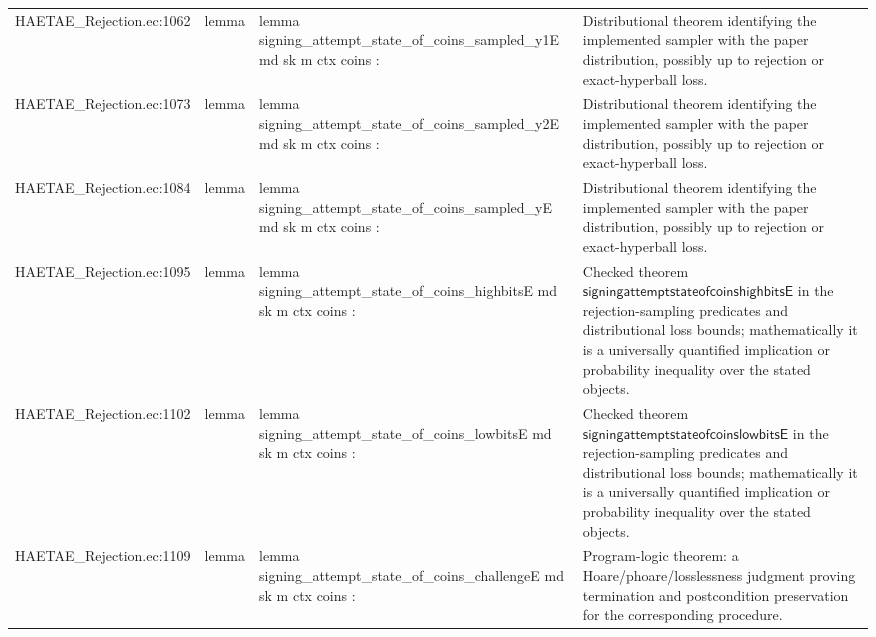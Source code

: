 \documentclass[10pt]{article}
\begin{document}
\begin{longtable}{L{0.11\textwidth}L{0.055\textwidth}L{0.385\textwidth}L{0.41\textwidth}}
HAETAE\_\allowbreak{}Rejection.\allowbreak{}ec:\allowbreak{}1062 & lemma & {\ttfamily\scriptsize lemma signing\_\allowbreak{}attempt\_\allowbreak{}state\_\allowbreak{}of\_\allowbreak{}coins\_\allowbreak{}sampled\_\allowbreak{}y1E md sk m ctx coins :} & Distributional theorem identifying the implemented sampler with the paper distribution, possibly up to rejection or exact-hyperball loss. \\
HAETAE\_\allowbreak{}Rejection.\allowbreak{}ec:\allowbreak{}1073 & lemma & {\ttfamily\scriptsize lemma signing\_\allowbreak{}attempt\_\allowbreak{}state\_\allowbreak{}of\_\allowbreak{}coins\_\allowbreak{}sampled\_\allowbreak{}y2E md sk m ctx coins :} & Distributional theorem identifying the implemented sampler with the paper distribution, possibly up to rejection or exact-hyperball loss. \\
HAETAE\_\allowbreak{}Rejection.\allowbreak{}ec:\allowbreak{}1084 & lemma & {\ttfamily\scriptsize lemma signing\_\allowbreak{}attempt\_\allowbreak{}state\_\allowbreak{}of\_\allowbreak{}coins\_\allowbreak{}sampled\_\allowbreak{}yE md sk m ctx coins :} & Distributional theorem identifying the implemented sampler with the paper distribution, possibly up to rejection or exact-hyperball loss. \\
HAETAE\_\allowbreak{}Rejection.\allowbreak{}ec:\allowbreak{}1095 & lemma & {\ttfamily\scriptsize lemma signing\_\allowbreak{}attempt\_\allowbreak{}state\_\allowbreak{}of\_\allowbreak{}coins\_\allowbreak{}highbitsE md sk m ctx coins :} & Checked theorem $\mathsf{signingattemptstateofcoinshighbitsE}$ in the rejection-sampling predicates and distributional loss bounds; mathematically it is a universally quantified implication or probability inequality over the stated objects. \\
HAETAE\_\allowbreak{}Rejection.\allowbreak{}ec:\allowbreak{}1102 & lemma & {\ttfamily\scriptsize lemma signing\_\allowbreak{}attempt\_\allowbreak{}state\_\allowbreak{}of\_\allowbreak{}coins\_\allowbreak{}lowbitsE md sk m ctx coins :} & Checked theorem $\mathsf{signingattemptstateofcoinslowbitsE}$ in the rejection-sampling predicates and distributional loss bounds; mathematically it is a universally quantified implication or probability inequality over the stated objects. \\
HAETAE\_\allowbreak{}Rejection.\allowbreak{}ec:\allowbreak{}1109 & lemma & {\ttfamily\scriptsize lemma signing\_\allowbreak{}attempt\_\allowbreak{}state\_\allowbreak{}of\_\allowbreak{}coins\_\allowbreak{}challengeE md sk m ctx coins :} & Program-logic theorem: a Hoare/phoare/losslessness judgment proving termination and postcondition preservation for the corresponding procedure. \\

\end{longtable}
\end{document}
